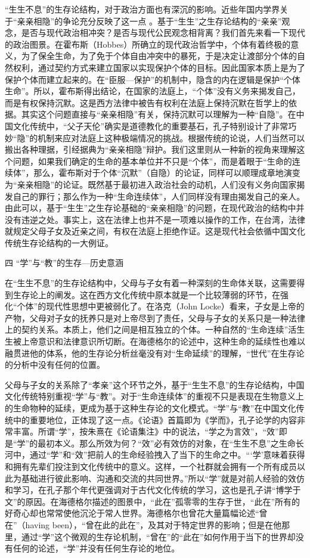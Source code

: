 \documentclass[UTF8, 12pt, a4paper]{ctexrep}
\begin{document}
“生生不息”的生存论结构，对于政治方面也有深沉的影响。近些年国内学界关于“亲亲相隐”的争论充分反映了这一点 。基于“生生”之生存论结构的“亲亲”观念，是否与现代政治相冲突？是否与现代公民观念相背离？我们首先来看一下现代的政治图景。在霍布斯（Hobbes）所确立的现代政治哲学中，个体有着终极的意义，为了保全生命，为了免于个体自由冲突中的暴死，于是决定让渡部分个体的自然权利，通过契约方式来建立国家以实现保护个体的目标。因此国家本质上是为了保护个体而建立起来的。在“臣服—保护”的机制中，隐含的内在逻辑是保护“个体生命”。所以，霍布斯得出结论，在国家的法庭上，“个体”没有义务来揭发自己，而是有权保持沉默。这是西方法律中被告有权利在法庭上保持沉默在哲学上的依据。其实这个问题直接与“亲亲相隐”有关，保持沉默可以理解为一种“自隐”。在中国文化传统中，“父子天伦”确实是道德教化的重要基石，孔子特别设计了非常巧妙“隐”的机制来应对法庭上这种极端情况的挑战。根据传统的论说，人们当然可以搬出各种理据，引经据典为“亲亲相隐”辩护。我们这里则从一种新的视角来理解这个问题，如果我们确定的生命的基本单位并不只是“个体”，而是着眼于“生命的连续体”，那么，霍布斯对于个体“沉默”（自隐）的论证，同样可以顺理成章地演变为“亲亲相隐”的论证。既然基于最初进入政治社会的动机，人们没有义务向国家揭发自己的罪行；那么作为一种“生命连续体”，人们同样没有理由揭发自己的亲人。由此可以，基于“生生”之生存论基础的“亲亲相隐”的问题，在现代政治的结构中并没有违逆之处。事实上，这在法律上也并不是一项难以操作的工作，在台湾，法律就规定父母子女及近亲之间，有权在法庭上拒绝作证。这是现代社会依循中国文化传统生存论结构的一大例证。

四 “学”与“教”的生存—历史意涵

在“生生不息”的生存论结构中，父母与子女有着一种深刻的生命体关联，这需要得到生存论上的阐发。这在西方文化传统中原本就是一个比较薄弱的环节，在强化“个体”的现代性思想中更被弱化了。在洛克（John Locke）看来，子女是上帝的产物，父母对子女的抚养只是对上帝尽到了责任，父母与子女的关系只是一种法律上的契约关系。本质上，他们之间是相互独立的个体。一种自然的“生命连续”活生生被上帝意识和法律意识所切断。在海德格尔的论述中，这种生命的延续性也难以融贯进他的体系，他的生存论分析丝毫没有对“生命延续”的理解，“世代”在生存论的分析中没有任何的位置。

父母与子女的关系除了“孝亲”这个环节之外，基于“生生不息”的生存论结构，中国文化传统特别重视“学”与“教”。对于“生命连续体”的重视不只是表现在生物意义上的生命物种的延续，更成为基于这种生存论的文化模式。“学”与“教”在中国文化传统中的重要地位，正体现了这一点。《论语》首篇即为《学而》，孔子论学的内容非常丰富。所谓“学”，按朱熹在《论语集注》中的说法，“学之为言效”，“效”即是“学”的最初本义。那么所效为何？“效”必有效仿的对象，在“生生不息”之生命长河中，通过“学”和“效”把前人的生命经验拽入了当下的生命之中。“‘学’意味着获得和拥有先辈们投注到文化传统中的意义。这样，一个社群就会拥有一个所有成员以此为基础进行彼此影响、沟通和交流的共同世界。”所以“学”就是对前人经验的效仿和学习，在孔子那个年代更强调对于古代文化传统的学习，这也是孔子讲“博学于文”的原因。在海德格尔描述的图景中，“此在”孤零零的生存于世，“此在”所有的好奇心却也常常使他沉沦于常人世界。海德格尔也曾花大量篇幅论述“曾在”（having been），“曾在此的此在”，及其对于特定世界的影响；但是在他那里，通过“学”这个微观的生存论机制，“曾在”的“此在”如何作用于当下的世界却没有任何的论述，“学”并没有任何生存论的地位。
\end{document}
